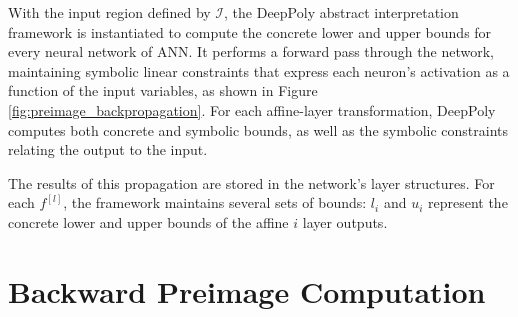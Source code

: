 With the input region defined by $\mathcal{I}$, the DeepPoly abstract interpretation framework is instantiated to compute the concrete lower and upper bounds for every neural network of ANN. It performs a forward pass through the network, maintaining  symbolic linear constraints that express each neuron's activation as a function of the input variables, as shown in Figure \ref{fig:preimage_backpropagation}. For each affine-layer transformation, DeepPoly computes both concrete and symbolic bounds, as well as the symbolic constraints relating the output to the input.

The results of this propagation are stored in the network's layer structures. For each $f^{[l]}$, the framework maintains several sets of bounds: $l_i$ and $u_i$ represent the concrete lower and upper bounds of the affine $i$ layer outputs.

\section{Backward Preimage Computation}

